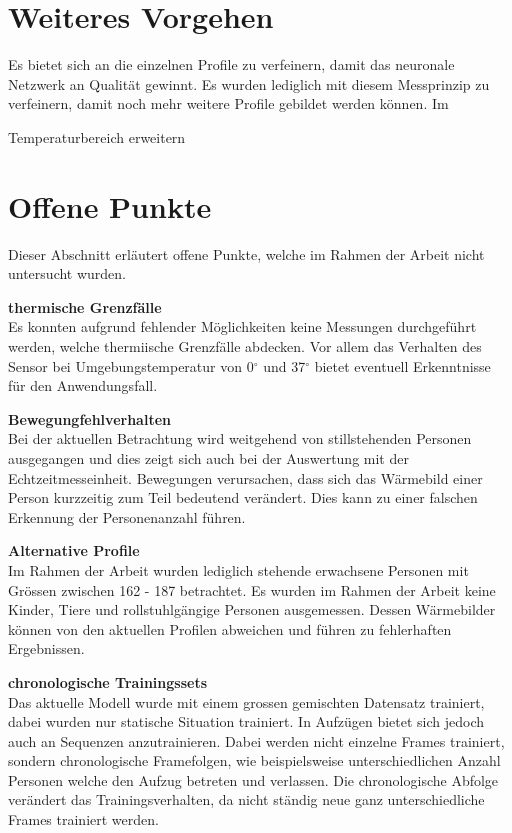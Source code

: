  





\section{Weiteres Vorgehen}

Es bietet sich an die einzelnen Profile zu verfeinern, damit das neuronale Netzwerk an Qualität gewinnt.  Es wurden lediglich 
mit diesem Messprinzip zu verfeinern, damit noch mehr weitere Profile gebildet werden können. Im 



Temperaturbereich erweitern

\section{Offene Punkte}

Dieser Abschnitt erläutert offene Punkte, welche im Rahmen der Arbeit nicht untersucht wurden.

\textbf{thermische Grenzfälle}\\
Es konnten aufgrund fehlender Möglichkeiten keine Messungen durchgeführt werden, welche thermiische Grenzfälle abdecken. Vor allem das Verhalten des Sensor bei Umgebungstemperatur von 0$^\circ$ und 37$^\circ$ bietet eventuell Erkenntnisse für den Anwendungsfall.

\textbf{Bewegungfehlverhalten}\\
Bei der aktuellen Betrachtung wird weitgehend von stillstehenden Personen ausgegangen und dies zeigt sich auch bei der Auswertung mit der Echtzeitmesseinheit. Bewegungen verursachen, dass sich das Wärmebild einer Person kurzzeitig zum Teil bedeutend verändert. Dies kann zu einer falschen Erkennung der Personenanzahl führen. 

\textbf{Alternative Profile}\\
Im Rahmen der Arbeit wurden lediglich stehende erwachsene Personen mit Grössen zwischen 162 - 187 betrachtet. Es wurden im Rahmen der Arbeit keine Kinder, Tiere und rollstuhlgängige Personen ausgemessen. Dessen Wärmebilder können von den aktuellen Profilen abweichen und führen zu fehlerhaften Ergebnissen.

\textbf{chronologische Trainingssets}\\
Das aktuelle Modell wurde mit einem grossen gemischten Datensatz trainiert, dabei wurden nur statische Situation trainiert. In Aufzügen bietet sich jedoch auch an Sequenzen anzutrainieren. Dabei werden nicht einzelne Frames trainiert, sondern chronologische Framefolgen, wie beispielsweise unterschiedlichen Anzahl Personen welche den Aufzug betreten und verlassen. Die chronologische Abfolge verändert das Trainingsverhalten, da nicht ständig neue ganz unterschiedliche Frames trainiert werden.


